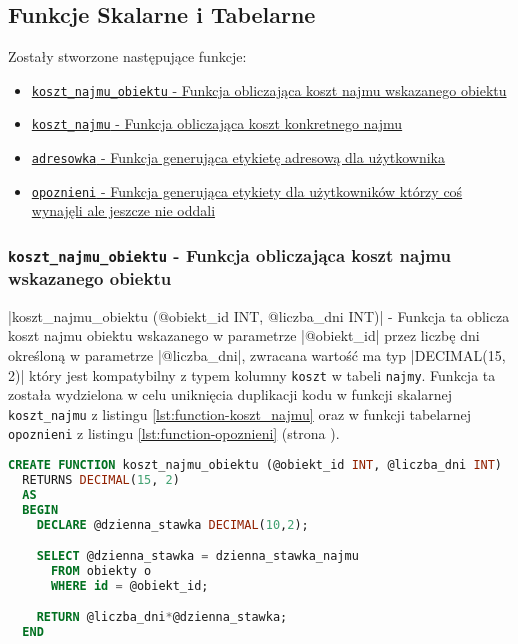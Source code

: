 \subsection{Funkcje Skalarne i Tabelarne}

Zostały stworzone następujące funkcje:
\begin{itemize}
	\item \href{run:Sources/SQL/3. Funkcje Skalarne/017_Utworzenie_funkcji_wyliczajacej_koszt_najmu_obiektu.sql}{\texttt{koszt\_najmu\_obiektu} - Funkcja obliczająca koszt najmu wskazanego obiektu}
	\item \href{run:Sources/SQL/3. Funkcje Skalarne/018_Utworzenie_funkcji_wyliczajacej_koszt_konkretnego_najmu.sql}{\texttt{koszt\_najmu} - Funkcja obliczająca koszt konkretnego najmu}
	\item \href{run:Sources/SQL/3. Funkcje Skalarne/020_Utworzenie_funkcji_wyswietlajacej_adresowke_uzytkownika.sql}{\texttt{adresowka} - Funkcja generująca etykietę adresową dla użytkownika}
	\item \href{run:Sources/SQL/4. Funkcje Tabelarne/021_Utworzenie_funkcji_wyswietlajacej_spozniajacych_sie_uzytkownikow.sql}{\texttt{opoznieni} - Funkcja generująca etykiety dla użytkowników którzy coś wynajęli ale jeszcze nie oddali}
\end{itemize}

\subsubsection{\texttt{koszt\_najmu\_obiektu} - Funkcja obliczająca koszt najmu wskazanego obiektu}

|koszt_najmu_obiektu (@obiekt_id INT, @liczba_dni INT)| - Funkcja ta oblicza koszt najmu obiektu wskazanego w parametrze |@obiekt_id| przez liczbę dni określoną w parametrze |@liczba_dni|, zwracana wartość ma typ |DECIMAL(15, 2)| który jest kompatybilny z typem kolumny \texttt{koszt} w tabeli \texttt{najmy}. Funkcja ta została wydzielona w celu uniknięcia duplikacji kodu w funkcji skalarnej \texttt{koszt\_najmu} z listingu \ref{lst:function-koszt_najmu} oraz w funkcji tabelarnej \texttt{opoznieni} z listingu \ref{lst:function-opoznieni} (strona \pageref{lst:function-opoznieni}).

\begin{lstlisting}[language=SQL, caption={Skrypt tworzący funkcję skalarną \texttt{koszt\_najmu\_obiektu}}, label={lst:function-koszt_najmu_obiektu}]
CREATE FUNCTION koszt_najmu_obiektu (@obiekt_id INT, @liczba_dni INT)
  RETURNS DECIMAL(15, 2)
  AS
  BEGIN
    DECLARE @dzienna_stawka DECIMAL(10,2);

    SELECT @dzienna_stawka = dzienna_stawka_najmu
      FROM obiekty o
      WHERE id = @obiekt_id;

    RETURN @liczba_dni*@dzienna_stawka;
  END
\end{lstlisting}

